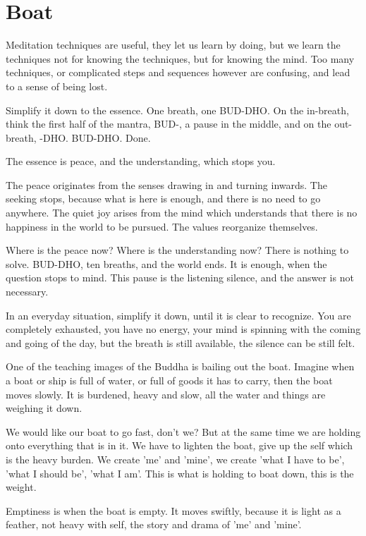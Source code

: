 \hypertarget{boat-1}{%
\chapter{Boat}\label{boat-1}}

Meditation techniques are useful, they let us learn by doing, but we
learn the techniques not for knowing the techniques, but for knowing the
mind. Too many techniques, or complicated steps and sequences however
are confusing, and lead to a sense of being lost.

Simplify it down to the essence. One breath, one BUD-DHO. On the
in-breath, think the first half of the mantra, BUD-, a pause in the
middle, and on the out-breath, -DHO. BUD-DHO. Done.

The essence is peace, and the understanding, which stops you.

The peace originates from the senses drawing in and turning inwards. The
seeking stops, because what is here is enough, and there is no need to
go anywhere. The quiet joy arises from the mind which understands that
there is no happiness in the world to be pursued. The values reorganize
themselves.

Where is the peace now? Where is the understanding now? There is nothing
to solve. BUD-DHO, ten breaths, and the world ends. It is enough, when
the question stops to mind. This pause is the listening silence, and the
answer is not necessary.

In an everyday situation, simplify it down, until it is clear to
recognize. You are completely exhausted, you have no energy, your mind
is spinning with the coming and going of the day, but the breath is
still available, the silence can be still felt.

One of the teaching images of the Buddha is bailing out the boat.
Imagine when a boat or ship is full of water, or full of goods it has to
carry, then the boat moves slowly. It is burdened, heavy and slow, all
the water and things are weighing it down.

We would like our boat to go fast, don't we? But at the same time we are
holding onto everything that is in it. We have to lighten the boat, give
up the self which is the heavy burden. We create 'me' and 'mine', we
create 'what I have to be', 'what I should be', 'what I am'. This is
what is holding to boat down, this is the weight.

Emptiness is when the boat is empty. It moves swiftly, because it is
light as a feather, not heavy with self, the story and drama of 'me' and
'mine'.

